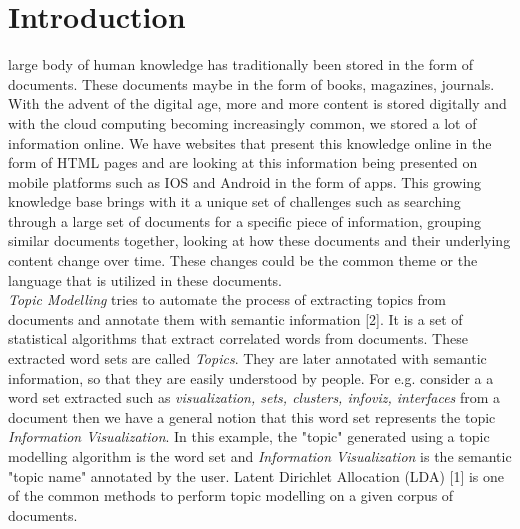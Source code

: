 \documentclass[10pt,journal,compsoc]{IEEEtran}
\begin{document}
\ifCLASSOPTIONcompsoc
{}
\else
\section{Introduction}
\label{sec:introduction}
\fi

 large body of human knowledge has traditionally been stored in the form of documents. These documents maybe in the form of books, magazines, journals. With the advent of the digital age, more and more content is stored digitally and with the cloud computing becoming increasingly common, we stored a lot of information online. We have websites that present this knowledge online in the form of HTML pages and are looking at this information being presented on mobile platforms such as IOS and Android in the form of apps. This growing knowledge base brings with it a unique set of challenges such as searching through a large set of documents for a specific piece of information, grouping similar documents together, looking at how these documents and their underlying content change over time. These changes could be the common theme or the language that is utilized in these documents.\\

\textit{Topic Modelling} tries to automate the process of extracting topics from documents and annotate them with semantic information [2]. It is a set of statistical algorithms that extract correlated words from documents. These extracted word sets are called \textit{Topics}. They are later annotated with semantic information, so that they are easily understood by people. For e.g. consider a a word set extracted such as \textit{visualization, sets, clusters, infoviz, interfaces} from a document then we have a general notion that this word set represents the topic \textit{Information Visualization}. In this example, the "topic" generated using a topic modelling algorithm is the word set and \textit{Information Visualization} is the semantic "topic name" annotated by the user. Latent Dirichlet Allocation (LDA) [1] is one of the common methods to perform topic modelling on a given corpus of documents. \\
\end{document}

